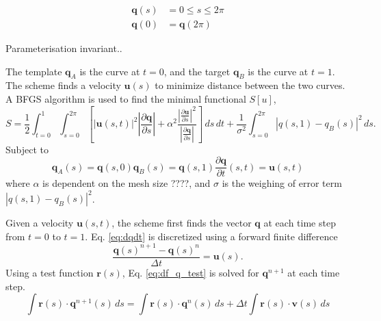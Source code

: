 \documentclass[a4paper, 10pt]{article}
\newcommand{\eq}[1]{Eq. \ref{eq:#1}}
\newcommand{\vect}[1]{\ensuremath{\mathbf{#1}}}
\begin{document}
\begin{align*}
  \vect q(s) &= 0 \leq s \leq 2\pi \\
  \vect q(0) &= \vect q(2\pi)
\end{align*}


Parameterisation invariant..


The template $\vect q_A$ is the curve at $t=0$, and the target $\vect q_B$
is the curve at $t=1$. The scheme finds a velocity $\vect u(s)$ to minimize
distance between the two curves. A BFGS algorithm is used to find the minimal
functional $S[u]$,
\begin{equation}
  \label{eq:S}
  S = \frac{1}{2} \int^{1}_{t=0} \int^{2\pi}_{s=0}\left[ \left| \vect u(s,t) \right|^2 
  \left| \frac{\partial \vect q}{\partial s} \right|  + 
  \alpha^2 \frac{ 
    \left| \frac{\partial \vect u}{\partial s}\right|^2}{
    \left| \frac{\partial \vect q}{\partial s}\right|}\right]  \,ds\,dt
  + \frac{1}{\sigma^2}\int^{2\pi}_{s=0}\left| q(s,1) - q_B(s)\right|^2\,ds.
\end{equation}
Subject to
\begin{subequations}
\begin{equation}
  \vect q_A(s) =\vect q(s,0)   \label{eq:template}
\end{equation}
\begin{equation}
  \vect q_B(s) = \vect q(s,1) \label{eq:target}
\end{equation}
\begin{equation}
  \frac{\partial \vect q}{\partial t}(s,t) = \vect u(s,t)  \label{eq:dqdt}
\end{equation}
\end{subequations}
where $\alpha$ is dependent on the mesh size ????, and $\sigma$ is the weighing
of error term $\left| q(s,1) - q_B(s)\right|^2$.


Given a velocity $\vect u(s,t)$, the scheme first finds the vector $\vect q$ at
each time step from $t=0$ to $t=1$. \eq{dqdt} is discretized using a forward finite difference
\begin{equation}
  \label{eq:fd_q}
  \frac{\vect q(s)^{n+1}- \vect q(s)^n}{\Delta t} = \vect u(s).
\end{equation}
Using a test function $\vect r(s)$, \eq{df_q_test} is solved for $\vect q^{n+1}$
at each time step.
  \begin{equation}
    \label{eq:df_q_test}
    \int \vect{r}(s) \cdot \vect{q}^{n+1}(s)\, ds = \int \vect{r}(s) \cdot
    \vect{q}^n (s)\,ds + \Delta t \int \vect{r}(s)\cdot \vect{v}(s)\, ds
  \end{equation}
\end{document}
